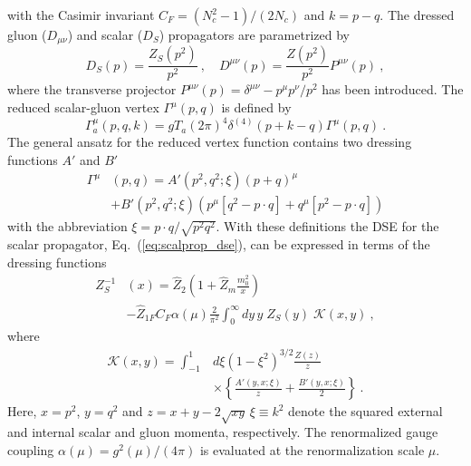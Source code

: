 \documentclass[final,twocolumn,merge,sort&compress]{elsarticle}
\def\Eq#1{Eq.~(\ref{#1})}
\begin{document}
with the Casimir invariant $C_F =(N_c^2-1)/(2N_c)$ and $k=p-q$.  The
dressed gluon (${D_{\mu\nu}}$) and scalar (${D}_S$) propagators are
parametrized by
\begin{equation}
\label{eq:prop_dressings}
 D_S(p) = \frac{Z_S(p^2)}{p^2} \ , \quad
 D^{\mu\nu}(p) =\frac{Z(p^2)}{p^2} P^{\mu\nu}(p) \ ,
\end{equation}
where the transverse projector
$P^{\mu\nu}(p) = \delta^{\mu\nu}-{p^\mu p^\nu}/{p^2}$ has been
introduced.  The reduced scalar-gluon vertex ${\Gamma}^\mu(p,q)$ is
defined by
\begin{equation}
\label{eq:scalar_gluon_vertex}
 {\Gamma}_a^\mu(p, q, k) =
 gT_a\left(2\pi\right)^4\delta^{(4)}\left(p+k-q\right){\Gamma}^\mu(p,q) \ .
\end{equation}
The general ansatz for the reduced vertex function contains two
dressing functions $A'$ and $B'$ \cite{Ball:1980ay, Ball:1980ax} 
\begin{equation}
 \label{eq:scalgluevertex_dressing}
\begin{split}
 {\Gamma}^\mu &(p,q) = A'(p^2,q^2;\xi) (p+q)^\mu \\
& +  B'(p^2,q^2;\xi)\left( p^\mu \left[q^2-p\cdot q\right]+q^\mu \left[p^2-p\cdot q\right]\right)
\end{split}
\end{equation}
with the abbreviation $\xi = p\cdot q/\sqrt{p^2 q^2}$.
With these definitions the DSE for the scalar propagator,
\Eq{eq:scalprop_dse}, can be expressed in terms of the dressing
functions
\begin{equation}
 \label{eq:scaldress_dse}
\begin{split}
  Z^{-1}_S &(x) = \hat{Z}_2\left(1+\hat{Z}_m \frac{m_0^2}{x}\right) \\
 & - \hat{Z}_{1F}C_F\alpha(\mu)\frac{2}{\pi^2}\int_0^\infty
 \!\!\!\!dy\, y\;Z_S(y)\;\mathcal{K}(x,y) \ ,
\end{split} 
\end{equation}
where
\begin{equation}
 \label{eq:scaldress_dse_2}
\begin{split}
  \mathcal{K}(x,y) = \int_{-1}^{1}\!\!\!
  &d\xi\left(1-\xi^2\right)^{3/2}\frac{Z(z)}{z} \\ 
 & \times\left\{\frac{A'(y,x;\xi)}{z}+\frac{B'(y,x;\xi)}{2}\right\} \ .
\end{split} 
\end{equation}
Here, $x=p^2$, $y=q^2$ and $z=x+y-2\sqrt{xy}\,\xi \equiv k^2$ denote the
squared external and internal scalar and gluon momenta, respectively.
The renormalized gauge coupling $\alpha(\mu)=g^2(\mu)/(4\pi)$
is evaluated at the renormalization scale $\mu$.
\end{document}
